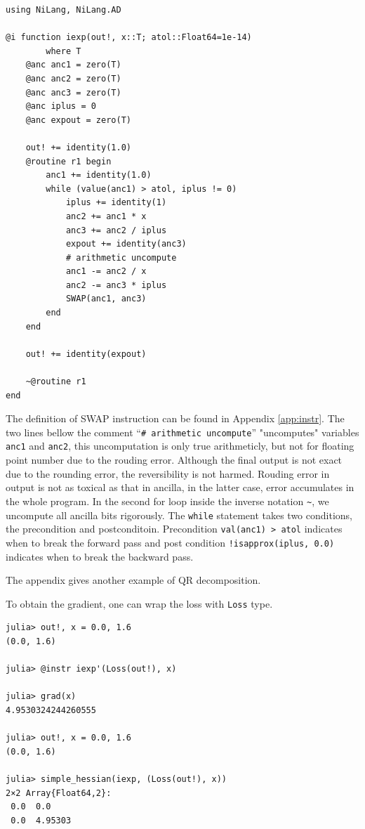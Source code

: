 \documentclass[aps,twocolumn,longbibliography,english,superscriptaddress,prr]{revtex4-1}
\newcommand{\<}{\langle}
\renewcommand{\>}{\rangle}
\newcommand{\App}[1]{Appendix \ref{#1}}
\theoremstyle{definition}\newtheorem{definition}{\textit{Definition}}
\begin{document}
\begin{minipage}{.44\textwidth}
\begin{lstlisting}
using NiLang, NiLang.AD

@i function iexp(out!, x::T; atol::Float64=1e-14)
        where T
    @anc anc1 = zero(T)
    @anc anc2 = zero(T)
    @anc anc3 = zero(T)
    @anc iplus = 0
    @anc expout = zero(T)

    out! += identity(1.0)
    @routine r1 begin
        anc1 += identity(1.0)
        while (value(anc1) > atol, iplus != 0)
            iplus += identity(1)
            anc2 += anc1 * x
            anc3 += anc2 / iplus
            expout += identity(anc3)
            # arithmetic uncompute
            anc1 -= anc2 / x
            anc2 -= anc3 * iplus
            SWAP(anc1, anc3)
        end
    end

    out! += identity(expout)

    ~@routine r1
end
\end{lstlisting}
\end{minipage}

The definition of SWAP instruction can be found in \App{app:instr}.
The two lines bellow the comment ``\texttt{\# arithmetic uncompute}'' "uncomputes" variables \texttt{anc1} and \texttt{anc2}, this uncomputation is only true arithmeticly, but not for floating point number due to the rouding error.
Although the final output is not exact due to the rounding error, the reversibility is not harmed.
Rouding error in output is not as toxical as that in ancilla, in the latter case, error accumulates in the whole program.
In the second for loop inside the inverse notation \texttt{\~}, we uncompute all ancilla bits rigorously.
The \texttt{while} statement takes two conditions, the precondition and postconditoin. Precondition \texttt{val(anc1) > atol} indicates when to break the forward pass and post condition \texttt{!isapprox(iplus, 0.0)} indicates when to break the backward pass.

The appendix gives another example of QR decomposition.

To obtain the gradient, one can wrap the loss with \texttt{Loss} type.

\begin{minipage}{.44\textwidth}
\begin{lstlisting}
julia> out!, x = 0.0, 1.6
(0.0, 1.6)

julia> @instr iexp'(Loss(out!), x)

julia> grad(x)
4.9530324244260555

julia> out!, x = 0.0, 1.6
(0.0, 1.6)

julia> simple_hessian(iexp, (Loss(out!), x))
2×2 Array{Float64,2}:
 0.0  0.0
 0.0  4.95303
\end{lstlisting}
\end{minipage}
\end{document}
